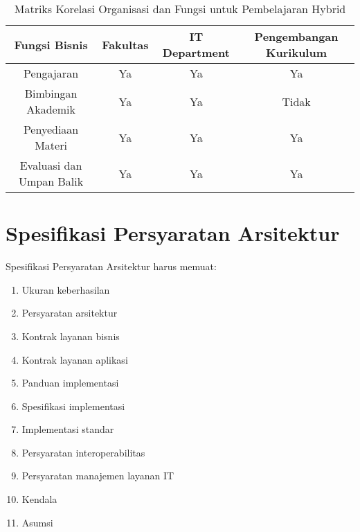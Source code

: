 \begin{table}[h]
	\centering
	\caption{Matriks Korelasi Organisasi dan Fungsi untuk Pembelajaran Hybrid}
	\begin{tabular}{|c|c|c|c|}
		\hline
		\textbf{Fungsi Bisnis} & \textbf{Fakultas} & \textbf{IT Department} & \textbf{Pengembangan Kurikulum} \\ \hline
		Pengajaran            & Ya                  & Ya                      & Ya                         \\ \hline
		Bimbingan Akademik    & Ya                  & Ya                      & Tidak                      \\ \hline
		Penyediaan Materi     & Ya                  & Ya                      & Ya                         \\ \hline
		Evaluasi dan Umpan Balik & Ya              & Ya                      & Ya                         \\ \hline
	\end{tabular}
\label{tbl:matriks-hybrid}
\end{table}

\section{Spesifikasi Persyaratan Arsitektur}
\label{sec:spesifikasi_persyaratan_arsitektur}
Spesifikasi Persyaratan Arsitektur harus memuat:
\begin{enumerate}
	\item Ukuran keberhasilan
	\item Persyaratan arsitektur
	\item Kontrak layanan bisnis
	\item Kontrak layanan aplikasi
	\item Panduan implementasi
	\item Spesifikasi implementasi
	\item Implementasi standar
	\item Persyaratan interoperabilitas
	\item Persyaratan manajemen layanan IT
	\item Kendala
	\item Asumsi
\end{enumerate}

